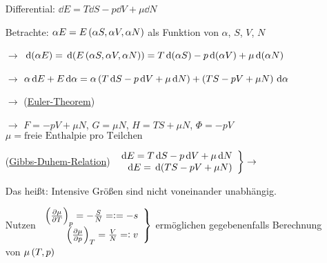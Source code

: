 \begin{itemize}[align=left]
  \item[Differential:]$\dd{E} = T \dd{S} - p \dd{V} + \mu \dd{N}$
  \item[Betrachte:] $\alpha E = E\left( \alpha S, \alpha V, \alpha N \right)$ als Funktion von $\alpha$, $S$, $V$, $N$
  \item[$\rightarrow$] $\,\text d{\left( \alpha E \right)} = \,\text d{\left( E\left( \alpha S, \alpha V, \alpha N \right) \right)} = T \,\text d{\left( \alpha S \right)} - p \,\text d{\left( \alpha V \right)} + \mu \,\text d{\left( \alpha N \right)}$
  \item[$\rightarrow$] $\alpha \,\text d{E} + E \,\text d{\alpha} = \alpha\left( T\,\text d{S} - p \,\text d{V} + \mu\,\text d{N} \right) + \left( TS-pV+\mu N \right)\,\text d{\alpha}$
  \item[$\rightarrow$]  (\uline{Euler-Theorem})
  \item[$\rightarrow$] $F = -p V + \mu N$, $G = \mu N$, $H = TS + \mu N$, $\Phi = -p V$ $\mu =\text{freie Enthalpie pro Teilchen}$
  \item[(\uline{Gibbs-Duhem-Relation})] $\left.\begin{array}{r}\,\text d{E} = T \,\text d{S}-p\,\text d{V}+\mu\,\text d{N}\\ \,\text d{E} = \,\text d{\left( TS-pV+\mu N \right)}\end{array} \right\} \rightarrow$ 
  \item[Das heißt:] Intensive Größen sind nicht voneinander unabhängig.
  \item[Nutzen] $\left.\begin{array}{r} \left(\frac{\partial \mu}{\partial T}\right)_{p} = -\frac{S}{N} = \vcentcolon = - s \\ \left(\frac{\partial \mu}{\partial p}\right)_{T} = \frac{V}{N} = \vcentcolon v \end{array} \right\}$ ermöglichen gegebenenfalls Berechnung von $\mu\left( T,p \right)$
\end{itemize}

